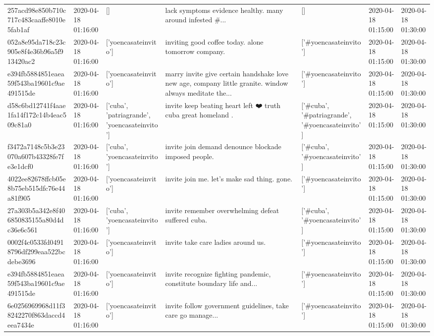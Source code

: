 \begin{tabular}{lllllll}
257acd98e850b710c717c483caaffe8010e5fab1af & 2020-04-18 01:16:00 & [] & lack symptoms evidence healthy. many around infested \#... & [] & 2020-04-18 01:15:00 & 2020-04-18 01:30:00 \\
052a8e95da718c23c905e8f4e36b96a5f913420ac2 & 2020-04-18 01:16:00 & ['yoencasateinvito'] & inviting good coffee today. alone tomorrow company. & ['#yoencasateinvito'] & 2020-04-18 01:15:00 & 2020-04-18 01:30:00 \\
e394fb5884851eaea59f543ba19601c9ae491515de & 2020-04-18 01:16:00 & ['yoencasateinvito'] & marry invite give certain handshake love new age, company little granite. window always meditate the... & ['#yoencasateinvito'] & 2020-04-18 01:15:00 & 2020-04-18 01:30:00 \\
d58c6bd12741f4aae1fa14f172c14b4eac509c81a0 & 2020-04-18 01:16:00 & ['cuba', 'patriagrande', 'yoencasateinvito'] & invite keep beating heart left ❤️ truth cuba great homeland . & ['#cuba', '#patriagrande', '#yoencasateinvito'] & 2020-04-18 01:15:00 & 2020-04-18 01:30:00 \\
f3472a7148c5b3e23070a607b43328fe7fe3e1dcf0 & 2020-04-18 01:16:00 & ['cuba', 'yoencasateinvito'] & invite join demand denounce blockade imposed people. & ['#cuba', '#yoencasateinvito'] & 2020-04-18 01:15:00 & 2020-04-18 01:30:00 \\
4022ee82678ffcb05e8b75eb515dfc76e44a81f905 & 2020-04-18 01:16:00 & ['yoencasateinvito'] & invite join me. let's make sad thing. gone. & ['#yoencasateinvito'] & 2020-04-18 01:15:00 & 2020-04-18 01:30:00 \\
27a303b5a342e8f406850835155a80d4dc36e6c561 & 2020-04-18 01:16:00 & ['cuba', 'yoencasateinvito'] & invite remember overwhelming defeat suffered cuba. & ['#cuba', '#yoencasateinvito'] & 2020-04-18 01:15:00 & 2020-04-18 01:30:00 \\
0002f4c0533fd04918796df299eaa522bcdebe3696 & 2020-04-18 01:16:00 & ['yoencasateinvito'] & invite take care ladies around us. & ['#yoencasateinvito'] & 2020-04-18 01:15:00 & 2020-04-18 01:30:00 \\
e394fb5884851eaea59f543ba19601c9ae491515de & 2020-04-18 01:16:00 & ['yoencasateinvito'] & invite recognize fighting pandemic, constitute boundary life and... & ['#yoencasateinvito'] & 2020-04-18 01:15:00 & 2020-04-18 01:30:00 \\
6e0256969968d11f38242270f863daccd4eea7434e & 2020-04-18 01:16:00 & ['yoencasateinvito'] & invite follow government guidelines, take care go manage... & ['#yoencasateinvito'] & 2020-04-18 01:15:00 & 2020-04-18 01:30:00 \\

\end{tabular}
